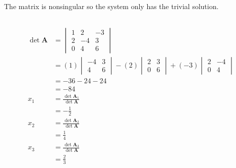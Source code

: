 \documentclass{article}
\begin{document}
The matrix is nonsingular so the system only has the trivial solution.

\setcounter{subsubsection}{34}
\subsubsection{}

\begin{align*}                                                     \\
  \det \mathbf{A} & = \begin{vmatrix}
                        1 & 2  & -3 \\
                        2 & -4 & 3  \\
                        0 & 4  & 6
                      \end{vmatrix}                                              \\
                  & = (1) \begin{vmatrix}
                            -4 & 3 \\
                            4  & 6
                          \end{vmatrix} - (2) \begin{vmatrix}
                                                2 & 3 \\
                                                0 & 6
                                              \end{vmatrix} + (-3) \begin{vmatrix}
                                                                     2 & -4 \\
                                                                     0 & 4
                                                                   \end{vmatrix} \\
                  & = -36 - 24 - 24                                               \\
                  & = -84                                                         \\
  x_1             & = \frac{\det \mathbf{A}_1}{\det \mathbf{A}}                   \\
                  & = -\frac{1}{2}                                                \\
  x_2             & = \frac{\det \mathbf{A}_2}{\det \mathbf{A}}                   \\
                  & = \frac{1}{4}                                                 \\
  x_3             & = \frac{\det \mathbf{A}_3}{\det \mathbf{A}}                   \\
                  & = \frac{2}{3}
\end{align*}
\end{document}
